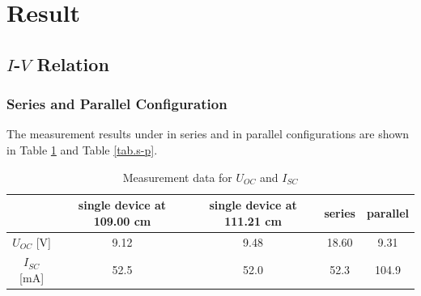 \documentclass{article}
\begin{document}
{		\section{Result}
		
	\subsection{$I$-$V$ Relation}
\subsubsection{Series and Parallel Configuration}
	
The measurement results under in series and in parallel configurations are shown in Table \ref{tab.oc-sc} and Table \ref{tab.s-p}.

\begin{table}[H]
\centering
\begin{tabular}{c||c|c|c|c}
\toprule
              & single device at 109.00 cm & single device at 111.21 cm & series & parallel \\ \midrule
$U_{OC}$ {[}V{]}  & 9.12                       & 9.48                       & 18.60  & 9.31     \\ \midrule
$I_{SC}$ {[}mA{]} & 52.5                       & 52.0                       & 52.3   & 104.9    \\ \bottomrule
\end{tabular}\caption{Measurement data for $U_{OC}$ and $I_{SC}$}\label{tab.oc-sc}
\end{table}

}
\end{document}
